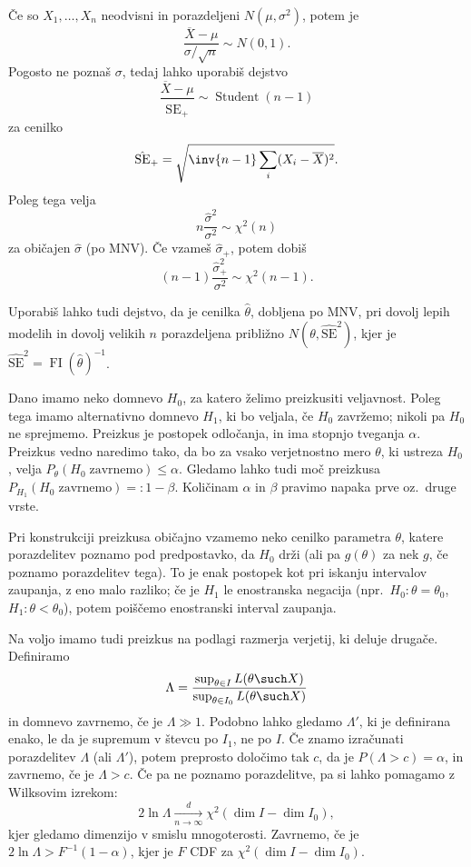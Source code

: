 Če so $X_1, \ldots, X_n$ neodvisni in porazdeljeni $N(\mu, \sigma^2)$, potem je
\[
  \frac{\overline{X} - \mu}{\sigma / \sqrt{n}}
  \sim N(0,1).
\]
Pogosto ne poznaš $\sigma$, tedaj lahko uporabiš dejstvo
\[
  \frac{\overline{X} - \mu}{\hat{\text{SE}}_+} \sim \operatorname{Student}(n-1)
\]
za cenilko
\[
  \hat{\text{SE}}_+ = \sqrt{\inv{n-1} \sum_{i} (X_i - \overline{X})^2}.
\]
Poleg tega velja
\[
  n \frac{\hat{\sigma}^2}{\sigma^2} \sim \chi^2(n)
\]
za običajen $\hat{\sigma}$ (po MNV).
Če vzameš $\hat{\sigma}_+$, potem dobiš
\[
  (n-1) \frac{\hat{\sigma}_+^2}{\sigma^2} \sim \chi^2(n-1).
\]

Uporabiš lahko tudi dejstvo, da je cenilka $\hat{\theta}$, dobljena po MNV, pri
dovolj lepih modelih in dovolj velikih $n$ porazdeljena približno $N(\theta,
\hat{\text{SE}}^2)$, kjer je $\hat{\text{SE}}^2 =
\operatorname{FI}(\hat{\theta})^{-1}$.


Dano imamo neko domnevo $H_0$, za katero želimo preizkusiti veljavnost.
Poleg tega imamo alternativno domnevo $H_1$, ki bo veljala, če $H_0$ zavržemo;
nikoli pa $H_0$ ne sprejmemo.
Preizkus je postopek odločanja, in ima stopnjo tveganja $\alpha$.
Preizkus vedno naredimo tako, da bo za vsako verjetnostno mero $\theta$, ki
ustreza $H_0$, velja $P_\theta(H_0\;\text{zavrnemo}) \le \alpha$.
Gledamo lahko tudi moč preizkusa $P_{H_1}(H_0\;\text{zavrnemo}) =: 1-\beta$.
Količinam $\alpha$ in $\beta$ pravimo napaka prve oz.~druge vrste.

Pri konstrukciji preizkusa običajno vzamemo neko cenilko parametra $\theta$,
katere porazdelitev poznamo pod predpostavko, da $H_0$ drži
(ali pa $g(\theta)$ za nek $g$, če poznamo porazdelitev tega).
To je enak postopek kot pri iskanju intervalov zaupanja, z eno malo razliko; če
je $H_1$ le enostranska negacija (npr.~$H_0: \theta = \theta_0$, $H_1: \theta <
\theta_0$), potem poiščemo enostranski interval zaupanja.

Na voljo imamo tudi preizkus na podlagi razmerja verjetij, ki deluje drugače.
Definiramo
\[
  \Lambda = \frac{\sup_{\theta \in I} L(\theta \such X)}{\sup_{\theta \in I_0}
	L(\theta \such X)}
\]
in domnevo zavrnemo, če je $\Lambda \gg 1$.
Podobno lahko gledamo $\Lambda'$, ki je definirana enako, le da je supremum v
števcu po $I_1$, ne po $I$.
Če znamo izračunati porazdelitev $\Lambda$ (ali $\Lambda'$), potem preprosto
določimo tak $c$, da je $P(\Lambda > c) = \alpha$, in zavrnemo, če je $\Lambda >
c$.
Če pa ne poznamo porazdelitve, pa si lahko pomagamo z Wilksovim izrekom:
\[
  2 \ln \Lambda \xrightarrow[n \to \infty]{d} \chi^2(\dim I - \dim I_0),
\]
kjer gledamo dimenzijo v smislu mnogoterosti.
Zavrnemo, če je $2 \ln \Lambda > F^{-1}(1 - \alpha)$, kjer je $F$ CDF za
$\chi^2(\dim I - \dim I_0)$.

